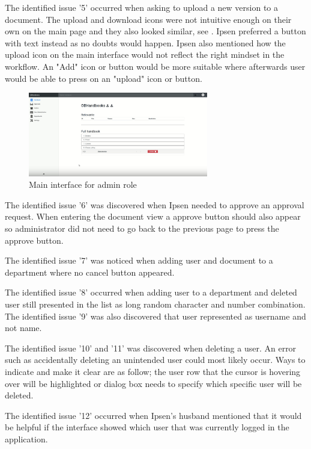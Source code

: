 The identified issue '5' occurred when asking to upload a new version to a document.
The upload and download icons were not intuitive enough on their own on the main page and they also looked similar, see .
Ipsen preferred a button with text instead as no doubts would happen.
Ipsen also mentioned how the upload icon on the main interface would not reflect the right mindset in the workflow.
An "Add" icon or button would be more suitable where afterwards user would be able to press on an "upload" icon or button.

\begin{figure}[H]
	\centering
		\includegraphics[width=0.7\textwidth]{billeder/MainInterfaceAdmin.png}
	\caption{Main interface for admin role}\label{fig:MainInterfaceAdmin}
\end{figure}

The identified issue '6' was discovered when Ipsen needed to approve an approval request.
When entering the document view a approve button should also appear so administrator did not need to go back to the previous page to press the approve button.

The identified issue '7' was noticed when adding user and document to a department where no cancel button appeared.

The identified issue '8' occurred when adding user to a department and deleted user still presented in the list as long random character and number combination. The identified issue '9' was also discovered that user represented as username and not name.

The identified issue '10'  and '11' was discovered when deleting a user.
An error such as accidentally deleting an unintended user could most likely occur.
Ways to indicate and make it clear are as follow; the user row that the cursor is hovering over will be highlighted or dialog box needs to specify which specific user will be deleted.

The identified issue '12' occurred when Ipsen's husband mentioned that it would be helpful if the interface showed which user that was currently logged in the application.

